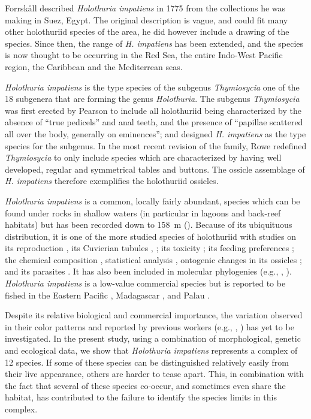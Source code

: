 \documentclass{article}
\begin{document}

Forrsk\r{a}ll described \textit{Holothuria impatiens} in 1775 from the
collections he was making in Suez, Egypt. The original description is vague, and
could fit many other holothuriid species of the area, he did however include a
drawing of the species. Since then, the range of \textit{H. impatiens} has been
extended, and the species is now thought to be occurring in the Red Sea, the
entire Indo-West Pacific region, the Caribbean and the Mediterrean seas.

\textit{Holothuria impatiens} is the type species of the subgenus
\textit{Thymiosycia} one of the 18 subgenera that are forming the genus
\textit{Holothuria}. The subgenus \textit{Thymiosycia} was first erected by
Pearson \cite{Pearson1915} to include all holothuriid being characterized by the
absence of ``true pedicels'' and anal teeth, and the presence of ``papillae
scattered all over the body, generally on eminences''; and designed
\textit{H. impatiens} as the type species for the subgenus. In the most recent
revision of the family, Rowe \cite{Rowe1969} redefined \textit{Thymiosycia} to
only include species which are characterized by having well developed, regular
and symmetrical tables and buttons. The ossicle assemblage of
\textit{H. impatiens} therefore exemplifies the holothuriid ossicles.

\textit{Holothuria impatiens} is a common, locally fairly abundant, species
which can be found under rocks in shallow waters (in particular in lagoons and
back-reef habitats) but has been recorded down to 158~m (\cite{Samyn2013}).
Because of its ubiquituous distribution, it is one of the more studied species
of holothuriid with studies on its reproduction \cite{Harriot1985}, its
Cuvierian tubules \cite{Flammang2002}, \cite{Becker+Flammang2010}; its toxicity
\cite{Bakus1974}; its feeding preferences \cite{Roberts1982}; the chemical
composition \cite{Hampton1958}, statistical analysis \cite{Hampton1959},
ontogenic changes in its ossicles \cite{Cutress1996}; and its parasites
\cite{Martens1994}.  It has also been included in molecular phylogenies (e.g.,
\cite{Lacey2005}, \cite{Honey-Escandon2012}). \textit{Holothuria impatiens} is a
low-value commercial species but is reported to be fished in the Eastern Pacific
\cite{Toral-Granda2008}, Madagascar \cite{Conand2007}, and Palau
\cite{Pakoa2009}.

Despite its relative biological and commercial importance, the variation
observed in their color patterns and reported by previous workers (e.g.,
\cite[p.178]{Clark1921}, \cite{Rowe+Richmond2004}) has yet to be
investigated. In the present study, using a combination of morphological,
genetic and ecological data, we show that \textit{Holothuria impatiens}
represents a complex of 12 species. If some of these species can be
distinguished relatively easily from their live appearance, others are harder to
tease apart. This, in combination with the fact that several of these species
co-occur, and sometimes even share the habitat, has contributed to the failure
to identify the species limits in this complex.
\end{document}
